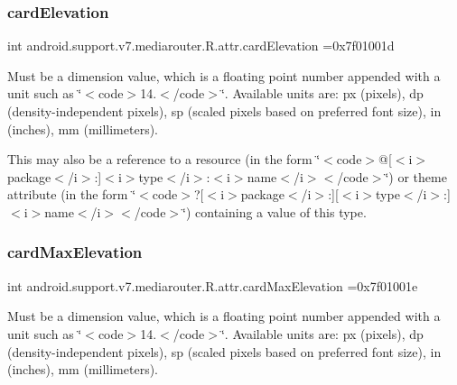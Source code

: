 \subsubsection{\texorpdfstring{card\+Elevation}{cardElevation}}
{\footnotesize\ttfamily int android.\+support.\+v7.\+mediarouter.\+R.\+attr.\+card\+Elevation =0x7f01001d\hspace{0.3cm}{\ttfamily [static]}}

Must be a dimension value, which is a floating point number appended with a unit such as \char`\"{}$<$code$>$14.\+5sp$<$/code$>$\char`\"{}. Available units are\+: px (pixels), dp (density-\/independent pixels), sp (scaled pixels based on preferred font size), in (inches), mm (millimeters). 

This may also be a reference to a resource (in the form \char`\"{}$<$code$>$@\mbox{[}$<$i$>$package$<$/i$>$\+:\mbox{]}$<$i$>$type$<$/i$>$\+:$<$i$>$name$<$/i$>$$<$/code$>$\char`\"{}) or theme attribute (in the form \char`\"{}$<$code$>$?\mbox{[}$<$i$>$package$<$/i$>$\+:\mbox{]}\mbox{[}$<$i$>$type$<$/i$>$\+:\mbox{]}$<$i$>$name$<$/i$>$$<$/code$>$\char`\"{}) containing a value of this type. \mbox{\label{classandroid_1_1support_1_1v7_1_1mediarouter_1_1R_1_1attr_a261321b379e1a19092487ee349c07fe5}} 
\subsubsection{\texorpdfstring{card\+Max\+Elevation}{cardMaxElevation}}
{\footnotesize\ttfamily int android.\+support.\+v7.\+mediarouter.\+R.\+attr.\+card\+Max\+Elevation =0x7f01001e\hspace{0.3cm}{\ttfamily [static]}}

Must be a dimension value, which is a floating point number appended with a unit such as \char`\"{}$<$code$>$14.\+5sp$<$/code$>$\char`\"{}. Available units are\+: px (pixels), dp (density-\/independent pixels), sp (scaled pixels based on preferred font size), in (inches), mm (millimeters). 

